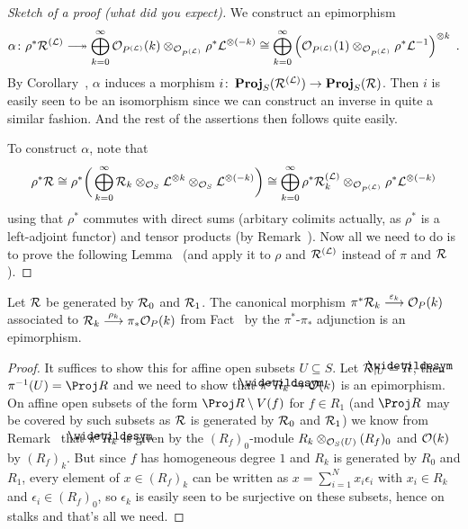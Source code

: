 \documentclass[a4paper,parskip=half,numbers=enddot, DIV=12]{scrreprt}
\begin{document}
\begin{proof}[Sketch of a proof (what did you expect)]
	We construct an epimorphism
	\begin{align*}
		\alpha\colon \rho^*\Rr^{(\Ll)}\epimorphism \bigoplus_{k=0}^\infty\Oo_{P^{(\Ll)}}(k)\otimes_{\Oo_{P^{(\Ll)}}}\rho^*\Ll^{\otimes( -k)}\cong \bigoplus_{k=0}^\infty\left(\Oo_{P^{(\Ll)}}(1)\otimes_{\Oo_{P^{(\Ll)}}}\rho^*\Ll^{-1}\right)^{\otimes k}\;.
	\end{align*}
	By Corollary~, $\alpha$ induces a morphism $i\colon\PROJ_S(\Rr^{(\Ll)})\morphism\PROJ_S(\Rr)$. Then $i$ is easily seen to be an isomorphism since we can construct an inverse in quite a similar fashion. And the rest of the assertions then follows quite easily.
	
	To construct $\alpha$, note that 
	\begin{align*}
		\rho^*\mathcal{R}\cong \rho^*\bigg(\bigoplus_{k=0}^\infty\mathcal{R}_k\otimes_{\mathcal{O}_S}\mathcal{L}^{\otimes k}\otimes_{\mathcal{O}_S}\mathcal{L}^{\otimes(-k)}\bigg)\cong \bigoplus_{k=0}^\infty\rho^*\mathcal{R}_k^{(\mathcal{L})}\otimes_{\mathcal{O}_{P^{(\mathcal{L})}}}\rho^*\mathcal{L}^{\otimes(-k)}
	\end{align*}
	using that $\rho^*$ commutes with direct sums (arbitary colimits actually, as $\rho^*$ is a left-adjoint functor) and tensor products (by Remark~). Now all we need to do is to prove the following Lemma~ (and apply it to $\rho$ and $\mathcal{R}^{(\mathcal{L})}$ instead of $\pi$ and $\mathcal{R}$).
\end{proof}
\begin{lem}
	Let $\mathcal{R}$ be generated by $\mathcal{R}_0$ and $\mathcal{R}_1$. The canonical morphism $\pi^*\Rr_k\morphism[\epsilon_k]\Oo_P(k)$ associated to $\Rr_k\morphism[\rho_k]\pi_*\Oo_P(k)$ from Fact~ by the $\pi^*$-$\pi_*$ adjunction is an epimorphism.
\end{lem}
\begin{proof}
	It suffices to show this for affine open subsets $U\subseteq S$. Let $\Rr|_U=\snake{R}$, then $\pi^{-1}(U)=\Proj R$ and we need to show that $\pi^*\snake{R}_k\morphism\Oo(k)$ is an epimorphism. On affine open subsets of the form $\Proj R\setminus V(f)$ for $f\in R_1$ (and $\Proj R$ may be covered by such subsets as $\mathcal{R}$ is generated by $\mathcal{R}_0$ and $\mathcal{R}_1$) we know from Remark~ that $\pi^*\snake{R}_k$ is given by the $(R_f)_0$-module $R_k\otimes_{\mathcal{O}_S(U)}(R_f)_0$ and $\mathcal{O}(k)$ by $(R_f)_k$. But since $f$ has homogeneous degree $1$ and $R_k$ is generated by $R_0$ and $R_1$, every element of $x\in (R_f)_k$ can be written as $x=\sum_{i=1}^Nx_i\epsilon_i$ with $x_i\in R_k$ and $\epsilon_i\in (R_f)_0$, so $\epsilon_k$ is easily seen to be surjective on these subsets, hence on stalks and that's all we need.
\end{proof}
\end{document}
